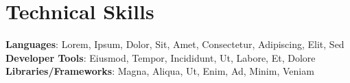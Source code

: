 \documentclass[letterpaper,11pt]{article}
\begin{document}
\section{Technical Skills}
 \begin{itemize}[leftmargin=0.15in, label={}]
    \small{\item{    
     \textbf{Languages}{: Lorem, Ipsum, Dolor, Sit, Amet, Consectetur, Adipiscing, Elit, Sed} \\[1mm]
     \textbf{Developer Tools}{: Eiusmod, Tempor, Incididunt, Ut, Labore, Et, Dolore} \\[1mm]
     \textbf{Libraries/Frameworks}{: Magna, Aliqua, Ut, Enim, Ad, Minim, Veniam} \\ [1mm]
    }}
 \end{itemize}
 \vspace{-16pt}
 \vspace{3pt}
\vspace{10pt}

\vspace{-15pt}
\end{document}
